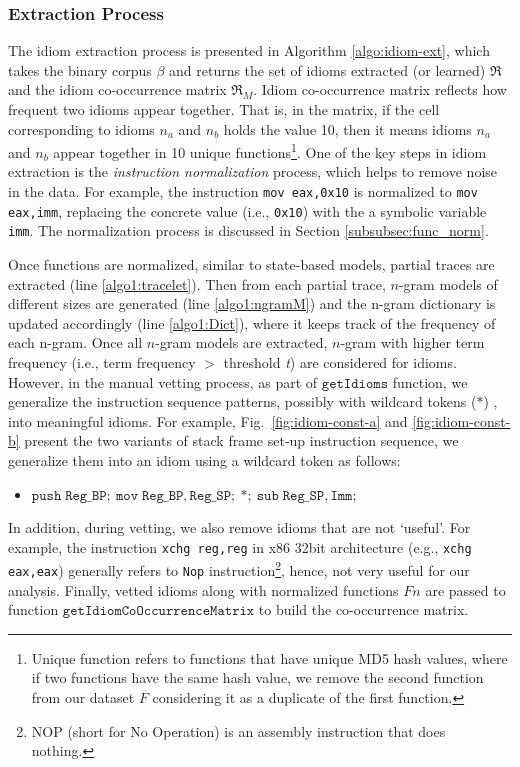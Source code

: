\subsubsection{Extraction Process} \label{subsubsec:process}

The idiom extraction process is presented in Algorithm \ref{algo:idiom-ext}, which takes the binary corpus $\beta$ and returns the set of idioms extracted (or learned) $\Re$ and the idiom co-occurrence matrix $\Re_M$. Idiom co-occurrence matrix reflects how frequent two idioms appear together. That is, in the matrix, if the cell corresponding to idioms $n_a$ and $n_b$ holds the value 10, then it means idioms $n_a$ and $n_b$ appear together in 10 unique functions\footnote{Unique function refers to functions that have unique MD5 hash values, where if two functions have the same hash value, we remove the second function from our dataset $F$ considering it as a duplicate of the first function.}.
One of the key steps in idiom extraction is the \emph{instruction normalization} process, which helps to remove noise in the data. For example, the instruction \texttt{mov eax,0x10} is normalized to \texttt{mov eax,imm}, replacing the concrete value (i.e., \texttt{0x10}) with the a symbolic variable \texttt{imm}. The normalization process is discussed in Section \ref{subsubsec:func_norm}.


Once functions are normalized, similar to state-based models, partial traces are extracted (line \ref{algo1:tracelet}). Then from each partial trace, $n$-gram models of different sizes are generated (line \ref{algo1:ngramM}) and the n-gram dictionary is updated accordingly (line \ref{algo1:Dict}), where it keeps track of the frequency of each n-gram. Once all $n$-gram models are  extracted, $n$-gram  with higher term frequency (i.e., term frequency $>$ threshold \textit{t}) are considered for idioms. However, in the manual vetting process, as part of $\mathtt{getIdioms}$ function, we generalize the instruction sequence patterns, possibly with wildcard tokens ($\ast$) \cite{rosenblum2011recovering}, into meaningful idioms. For example, Fig.~\ref{fig:idiom-const-a} and \ref{fig:idiom-const-b} present the two variants of stack frame set-up instruction sequence, we generalize them into an idiom using a wildcard token as follows:
\begin{itemize}
  \item[]$\mathtt{push \;Reg\_BP; \: mov \; Reg\_BP, Reg\_SP; \: \ast ;\: sub \; Reg\_SP, Imm;}$
\end{itemize}
In addition, during vetting, we also remove idioms that are not `useful'. For example, the instruction \texttt{xchg reg,reg} in x86 32bit architecture (e.g., \texttt{xchg eax,eax}) generally refers to \texttt{Nop} instruction\footnote{NOP (short for No Operation) is an assembly instruction that does nothing.}, hence, not very useful for our analysis. Finally, vetted idioms along with normalized functions $Fn$ are passed to function $\mathtt{getIdiomCoOccurrenceMatrix}$  to build the co-occurrence matrix.

